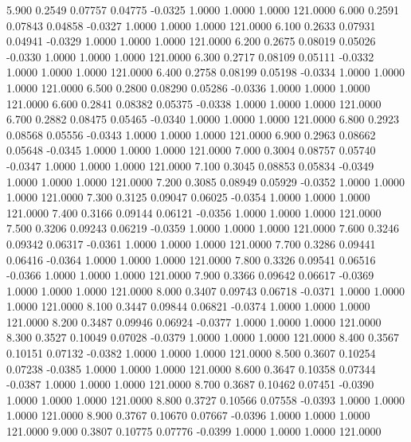    5.900   0.2549   0.07757   0.04775  -0.0325   1.0000   1.0000   1.0000 121.0000
   6.000   0.2591   0.07843   0.04858  -0.0327   1.0000   1.0000   1.0000 121.0000
   6.100   0.2633   0.07931   0.04941  -0.0329   1.0000   1.0000   1.0000 121.0000
   6.200   0.2675   0.08019   0.05026  -0.0330   1.0000   1.0000   1.0000 121.0000
   6.300   0.2717   0.08109   0.05111  -0.0332   1.0000   1.0000   1.0000 121.0000
   6.400   0.2758   0.08199   0.05198  -0.0334   1.0000   1.0000   1.0000 121.0000
   6.500   0.2800   0.08290   0.05286  -0.0336   1.0000   1.0000   1.0000 121.0000
   6.600   0.2841   0.08382   0.05375  -0.0338   1.0000   1.0000   1.0000 121.0000
   6.700   0.2882   0.08475   0.05465  -0.0340   1.0000   1.0000   1.0000 121.0000
   6.800   0.2923   0.08568   0.05556  -0.0343   1.0000   1.0000   1.0000 121.0000
   6.900   0.2963   0.08662   0.05648  -0.0345   1.0000   1.0000   1.0000 121.0000
   7.000   0.3004   0.08757   0.05740  -0.0347   1.0000   1.0000   1.0000 121.0000
   7.100   0.3045   0.08853   0.05834  -0.0349   1.0000   1.0000   1.0000 121.0000
   7.200   0.3085   0.08949   0.05929  -0.0352   1.0000   1.0000   1.0000 121.0000
   7.300   0.3125   0.09047   0.06025  -0.0354   1.0000   1.0000   1.0000 121.0000
   7.400   0.3166   0.09144   0.06121  -0.0356   1.0000   1.0000   1.0000 121.0000
   7.500   0.3206   0.09243   0.06219  -0.0359   1.0000   1.0000   1.0000 121.0000
   7.600   0.3246   0.09342   0.06317  -0.0361   1.0000   1.0000   1.0000 121.0000
   7.700   0.3286   0.09441   0.06416  -0.0364   1.0000   1.0000   1.0000 121.0000
   7.800   0.3326   0.09541   0.06516  -0.0366   1.0000   1.0000   1.0000 121.0000
   7.900   0.3366   0.09642   0.06617  -0.0369   1.0000   1.0000   1.0000 121.0000
   8.000   0.3407   0.09743   0.06718  -0.0371   1.0000   1.0000   1.0000 121.0000
   8.100   0.3447   0.09844   0.06821  -0.0374   1.0000   1.0000   1.0000 121.0000
   8.200   0.3487   0.09946   0.06924  -0.0377   1.0000   1.0000   1.0000 121.0000
   8.300   0.3527   0.10049   0.07028  -0.0379   1.0000   1.0000   1.0000 121.0000
   8.400   0.3567   0.10151   0.07132  -0.0382   1.0000   1.0000   1.0000 121.0000
   8.500   0.3607   0.10254   0.07238  -0.0385   1.0000   1.0000   1.0000 121.0000
   8.600   0.3647   0.10358   0.07344  -0.0387   1.0000   1.0000   1.0000 121.0000
   8.700   0.3687   0.10462   0.07451  -0.0390   1.0000   1.0000   1.0000 121.0000
   8.800   0.3727   0.10566   0.07558  -0.0393   1.0000   1.0000   1.0000 121.0000
   8.900   0.3767   0.10670   0.07667  -0.0396   1.0000   1.0000   1.0000 121.0000
   9.000   0.3807   0.10775   0.07776  -0.0399   1.0000   1.0000   1.0000 121.0000
